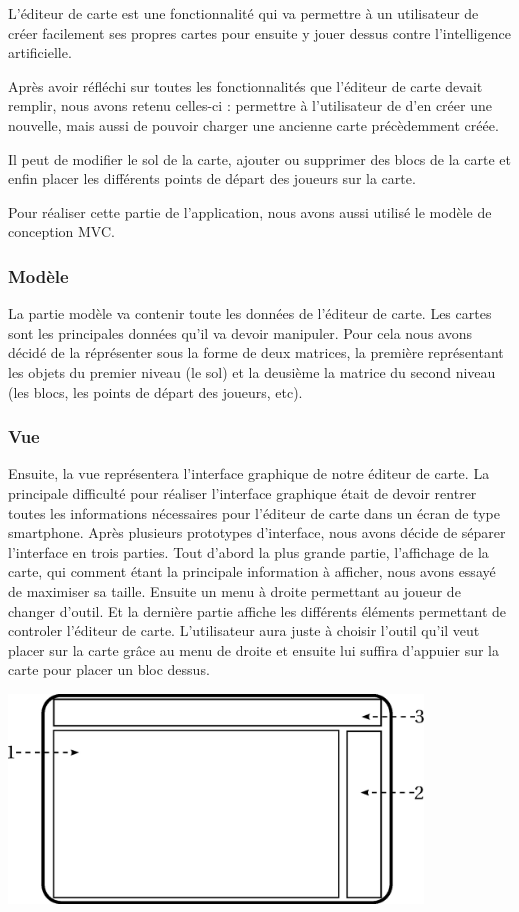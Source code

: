 	L'éditeur de carte est une fonctionnalité qui va permettre à un utilisateur
	 de créer facilement ses propres cartes pour ensuite y jouer dessus contre 
	 l'intelligence artificielle.
	 
	Après avoir réfléchi sur toutes les fonctionnalités que l'éditeur de carte 
	devait remplir, nous avons retenu celles-ci : permettre à l'utilisateur de 
	d'en créer une nouvelle, mais aussi de pouvoir charger une ancienne carte 
	précèdemment créée.
	
	Il peut de modifier le sol de la carte, ajouter ou supprimer des blocs de 
	la carte et enfin placer les différents points de départ des joueurs sur 
	la carte.
		
	Pour réaliser cette partie de l'application, nous avons aussi utilisé le 
	modèle de conception MVC.

	\subsubsection*{Modèle}
		La partie modèle va contenir toute les données de l'éditeur de carte. Les cartes sont les principales données qu'il va devoir manipuler. Pour cela nous avons décidé de la réprésenter sous la forme de deux matrices, la première représentant les objets du premier niveau (le sol) et la deusième la matrice du second niveau (les blocs, les points de départ des joueurs, etc).
			
			
	\subsubsection*{Vue}
		Ensuite, la vue représentera l'interface graphique de notre éditeur de carte. La principale difficulté pour réaliser l'interface graphique était de devoir rentrer toutes les informations nécessaires pour l'éditeur de carte dans un écran de type \gls{smartphone}. Après plusieurs prototypes d'interface, nous avons décide de séparer l'interface en trois parties. Tout d'abord la plus grande partie, l'affichage de la carte, qui comment étant la principale information à afficher, nous avons essayé de maximiser sa taille. Ensuite un menu à droite permettant au joueur de changer d'outil. Et la dernière partie affiche les différents éléments permettant de controler l'éditeur de carte. L'utilisateur aura juste à choisir l'outil qu'il veut placer sur la carte grâce au menu de droite et ensuite lui suffira d'appuier sur la carte pour placer un bloc dessus.
		
		\begin{center}
			\includegraphics[width=11cm]{./Analyse/Img/14-Editeur_de_niveau.eps}
		\end{center} 
			
